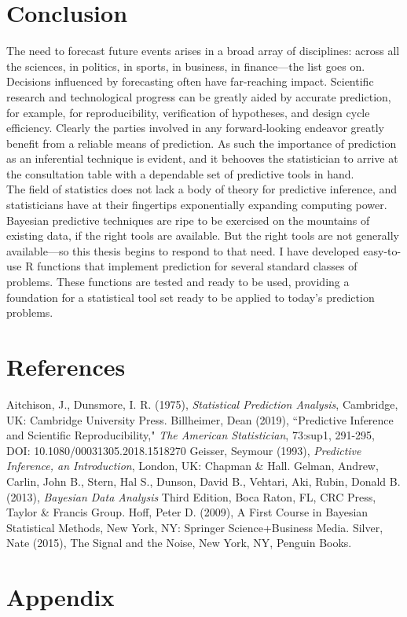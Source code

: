 \documentclass[12pt, a4paper]{article}
\begin{document}
\clearpage

\section{Conclusion}

The need to forecast future events arises in a broad array of disciplines: across all the sciences, in politics, in sports, in business, in finance---the list goes on.  Decisions influenced by forecasting often have far-reaching impact.  Scientific research and technological progress can be greatly aided by accurate prediction, for example, for reproducibility, verification of hypotheses, and design cycle efficiency.  Clearly the parties involved in any forward-looking endeavor greatly benefit from a reliable means of prediction.  As such the importance of prediction as an inferential technique is evident, and it behooves the statistician to arrive at the consultation table with a dependable set of predictive tools in hand.\\

\noindent The field of statistics does not lack a body of theory for predictive inference, and statisticians have at their fingertips exponentially expanding computing power.  Bayesian predictive techniques are ripe to be exercised on the mountains of existing data, if the right tools are available.  But the right tools are not generally available---so this thesis begins to respond to that need.  I have developed easy-to-use R functions that implement prediction for several standard classes of problems.  These functions are tested and ready to be used, providing a foundation for a statistical tool set ready to be applied to today's prediction problems.

\clearpage

\section{References}

% 

\begin{thebibliography}{6}
 Aitchison, J., Dunsmore, I. R. (1975), \textit{Statistical Prediction Analysis},
Cambridge, UK: Cambridge University Press.
 Billheimer, Dean (2019), ``Predictive Inference and Scientific Reproducibility," \textit{The American Statistician}, 73:sup1, 291-295, DOI: 10.1080/00031305.2018.1518270
 Geisser, Seymour (1993), \textit{Predictive Inference, an Introduction}, London, UK:  Chapman \& Hall.
 Gelman, Andrew, Carlin, John B., Stern, Hal S., Dunson, David B., Vehtari, Aki, Rubin, Donald B. (2013), \textit{Bayesian Data Analysis} Third Edition, Boca Raton, FL, CRC Press, Taylor \& Francis Group.
 Hoff, Peter D. (2009), A First Course in Bayesian Statistical Methods, New York, NY: Springer Science+Business Media.
 Silver, Nate (2015), The Signal and the Noise, New York, NY, Penguin Books.
\end{thebibliography}




\section{Appendix}
\end{document}
